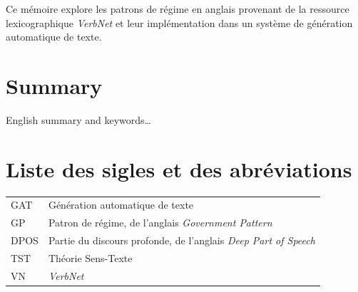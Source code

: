 \documentclass[12pt,maitrise,frenchb,natbib,twoside,initial]{dms}
\numberwithin{equation}{section}
\numberwithin{table}{chapter}
\numberwithin{figure}{chapter}
\begin{document}
\noindent Ce mémoire explore les patrons de régime en anglais provenant de la ressource lexicographique \emph{VerbNet} et leur implémentation dans un système de génération automatique de texte. 	

\chapter*{Summary}

\noindent English summary and keywords\dots


\cleardoublepage
{}  %
\tableofcontents				%
\cleardoublepage
{}
\listoftables
\cleardoublepage
{}
\listoffigures	



\chapter*{Liste des sigles et des abréviations}
\begingroup %
\renewcommand{\arraystretch}{2} 
\noindent\begin{tabular}{p{} p{}}
  GAT & Génération automatique de texte \\
  GP & Patron de régime, de l'anglais \textit{Government Pattern}\\
  DPOS  &  Partie du discours profonde, de l'anglais \textit{Deep Part of Speech}\\
  TST & Théorie Sens-Texte\\
  VN & \emph{ VerbNet}\\
\end{tabular}
\endgroup  %
\end{document}
